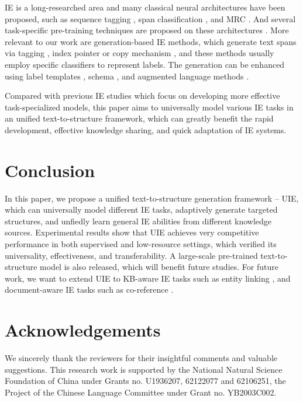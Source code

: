 \documentclass[11pt]{article}
\begin{document}
IE is a long-researched area and many classical neural architectures have been proposed, such as sequence tagging \citep{lample-etal-2016-neural,zheng-etal-2017-joint,lin-etal-2019-sequence}, span classification \citep{sohrab-miwa-2018-deep,lin-etal-2018-nugget,wadden-etal-2019-entity}, and MRC \citep{levy-etal-2017-zero,li-etal-2020-unified,du-cardie-2020-event}.
And several task-specific pre-training techniques are proposed on these architectures \citep{mengge-etal-2020-coarse,wang-etal-2021-cleve, qin-etal-2021-erica}.
More relevant to our work are generation-based IE methods, which generate text spans via tagging \citep{strakova-etal-2019-neural,ma-etal-2019-exploring}, index pointer \citep{ren-etal-2021-hyspa,yan-etal-2021-unified-generative} or copy mechanism \citep{zeng-etal-2018-extracting}, and these methods usually employ specific classifiers to represent labels.
The generation can be enhanced using label templates \citep{li-etal-2021-document,liu-etal-2021-fine,cui-etal-2021-template}, schema \citep{lu-etal-2021-text2event,ahmad-etal-2021-intent}, and augmented language methods \citep{paolini2021structured}.

Compared with previous IE studies which focus on developing more effective task-specialized models, this paper aims to universally model various IE tasks in an unified text-to-structure framework, which can greatly benefit the rapid development, effective knowledge sharing, and quick adaptation of IE systems.
 
\section{Conclusion} \label{sec:conclusion}

In this paper, we propose a unified text-to-structure generation framework – UIE, which can universally model different IE tasks, adaptively generate targeted structures, and unfiedly learn general IE abilities from different knowledge sources.
Experimental results show that UIE achieves very competitive performance in both supervised and low-resource settings, which verified its universality, effectiveness, and transferability.
A large-scale pre-trained text-to-structure model is also released, which will benefit future studies. For future work, we want to extend UIE to KB-aware IE tasks such as entity linking \citep{cao2021autoregressive}, and document-aware IE tasks such as co-reference \citep{lee-etal-2017-end, LU2022103632}.
 \section*{Acknowledgements}
We sincerely thank the reviewers for their insightful comments and valuable suggestions.
This research work is supported by the National Natural Science Foundation of China under Grants no. U1936207, 62122077 and 62106251, the Project of the Chinese Language Committee under Grant no. YB2003C002. 


\end{document}
